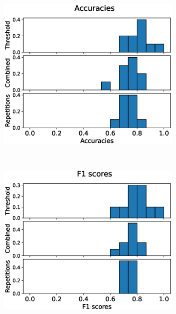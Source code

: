 \begin{figure}
  \centering
  \begin{subfigure}[t]{0.4\textwidth}
    \includegraphics[width=\textwidth]{files/figs/res/trunk/acc.eps}
    \caption{}
    \label{fig:trunk-acc}
  \end{subfigure}
  ~
  \begin{subfigure}[t]{0.4\textwidth}
    \includegraphics[width=\textwidth]{files/figs/res/trunk/f1.eps}
    \caption{}
    \label{fig:trunk-f1}
  \end{subfigure}


\end{figure}
